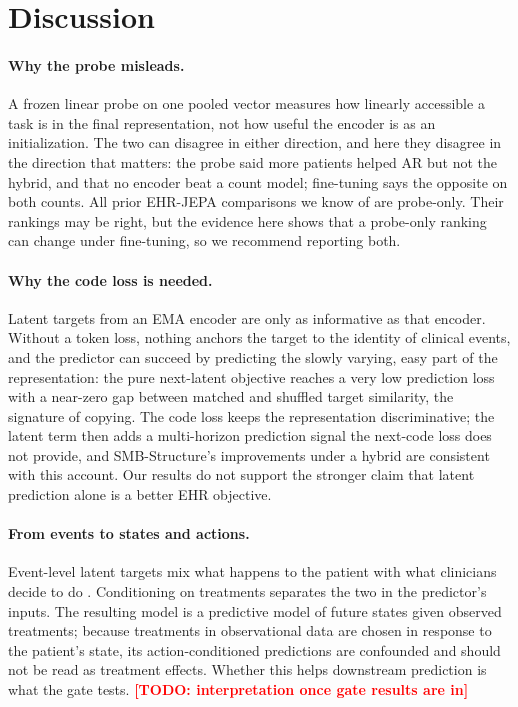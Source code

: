 \documentclass[10pt,letterpaper]{article}
\newcommand{\todo}[1]{\textcolor{red}{\textbf{[TODO: #1]}}}
\begin{document}
\section{Discussion}
\label{sec:discussion}

\paragraph{Why the probe misleads.}
A frozen linear probe on one pooled vector measures how linearly accessible a
task is in the final representation, not how useful the encoder is as an
initialization. The two can disagree in either direction, and here they
disagree in the direction that matters: the probe said more patients helped AR but not the
hybrid, and that no encoder beat a count model; fine-tuning says the opposite on
both counts. All prior EHR-JEPA comparisons we know of
\citep{smbstructure,clinjepa,imperialjepa} are probe-only. Their rankings may be right, but
the evidence here shows that a probe-only ranking can change under
fine-tuning, so we recommend reporting both.

\paragraph{Why the code loss is needed.}
Latent targets from an EMA encoder are only as informative as that encoder. Without
a token loss, nothing anchors the target to the identity of clinical events,
and the predictor can succeed by predicting the slowly varying, easy part of
the representation: the pure next-latent objective reaches a very low
prediction loss with a near-zero gap between matched and shuffled target similarity, the
signature of copying. The code loss keeps the representation discriminative; the latent
term then adds a multi-horizon prediction signal the next-code loss does not
provide, and SMB-Structure's improvements under a hybrid are consistent with this account.
Our results do not support the stronger claim that latent prediction alone is
a better EHR objective.

\paragraph{From events to states and actions.}
Event-level latent targets mix what happens to the patient with what clinicians
decide to do \citep{imperialjepa}. Conditioning on treatments separates the two
in the predictor's inputs. The resulting model is a predictive model of
future states given observed treatments; because treatments in observational
data are chosen in response to the patient's state, its action-conditioned
predictions are confounded and should not be read as treatment effects. Whether this helps downstream
prediction is what the gate tests. \todo{interpretation once gate results are in}
\end{document}
